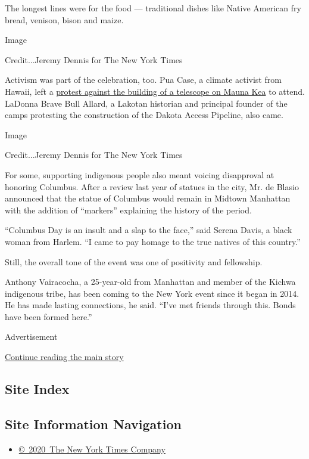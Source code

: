The longest lines were for the food --- traditional dishes like Native
American fry bread, venison, bison and maize.

Image

Credit...Jeremy Dennis for The New York Times

Activism was part of the celebration, too. Pua Case, a climate activist
from Hawaii, left a
\href{https://www.nytimes3xbfgragh.onion/2019/07/17/science/mauna-kea-protest.html?module=inline}{protest
against the building of a telescope on Mauna Kea} to attend. LaDonna
Brave Bull Allard, a Lakotan historian and principal founder of the
camps protesting the construction of the Dakota Access Pipeline, also
came.

Image

Credit...Jeremy Dennis for The New York Times

For some, supporting indigenous people also meant voicing disapproval at
honoring Columbus. After a review last year of statues in the city, Mr.
de Blasio announced that the statue of Columbus would remain in Midtown
Manhattan with the addition of ``markers'' explaining the history of the
period.

``Columbus Day is an insult and a slap to the face,'' said Serena Davis,
a black woman from Harlem. ``I came to pay homage to the true natives of
this country.''

Still, the overall tone of the event was one of positivity and
fellowship.

Anthony Vairacocha, a 25-year-old from Manhattan and member of the
Kichwa indigenous tribe, has been coming to the New York event since it
began in 2014. He has made lasting connections, he said. ``I've met
friends through this. Bonds have been formed here.''

Advertisement

\protect\hyperlink{after-bottom}{Continue reading the main story}

\hypertarget{site-index}{%
\subsection{Site Index}\label{site-index}}

\hypertarget{site-information-navigation}{%
\subsection{Site Information
Navigation}\label{site-information-navigation}}

\begin{itemize}
\tightlist
\item
  \href{https://help.nytimes3xbfgragh.onion/hc/en-us/articles/115014792127-Copyright-notice}{©~2020~The
  New York Times Company}
\end{itemize}


